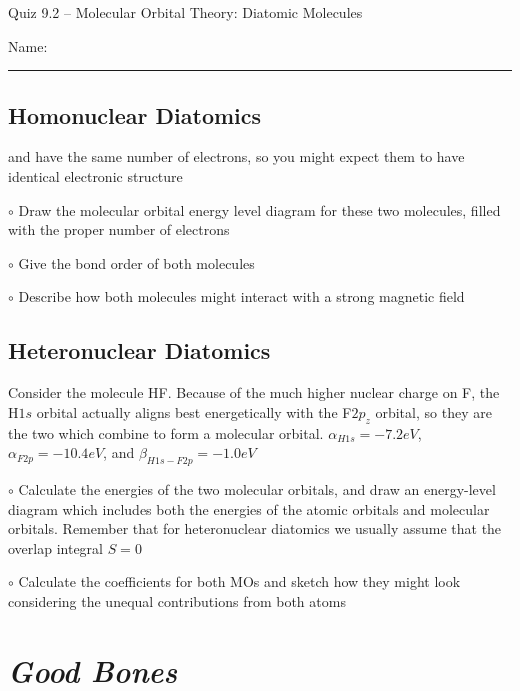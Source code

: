 \documentclass[11pt, letterpaper]{memoir}
\begin{document}
\begin{center}
	{\large Quiz 9.2 -- Molecular Orbital Theory: Diatomic Molecules}
\end{center}
{\large Name: \rule[-1mm]{4in}{.1pt}

\subsection*{Homonuclear Diatomics}

 and  have the same number of electrons, so you might expect them to have identical electronic structure

\noindent $\circ$ Draw the molecular orbital energy level diagram for these two molecules, filled with the proper number of electrons

\vspace{30em}
\noindent $\circ$ Give the bond order of both molecules

\vspace{5em}
\noindent $\circ$ Describe how both molecules might interact with a strong magnetic field

\newpage
\subsection*{Heteronuclear Diatomics}

Consider the molecule HF. Because of the much higher nuclear charge on F, the H$1s$ orbital actually aligns best energetically with the F$2p_z$ orbital, so they are the two which combine to form a molecular orbital. $\alpha_{H1s} = -7.2eV$, $\alpha_{F2p}=-10.4eV$, and $\beta_{H1s-F2p}=-1.0eV$

\noindent $\circ$ Calculate the energies of the two molecular orbitals, and draw an energy-level diagram which includes both the energies of the atomic orbitals and molecular orbitals. Remember that for heteronuclear diatomics we usually assume that the overlap integral $S=0$

\vspace{27em}
\noindent $\circ$ Calculate the coefficients for both MOs and sketch how they might look considering the unequal contributions from both atoms

\newpage
\pagestyle{empty}
\addtocounter{page}{-1}
\section*{\emph{Good Bones}}
}
\end{document}
